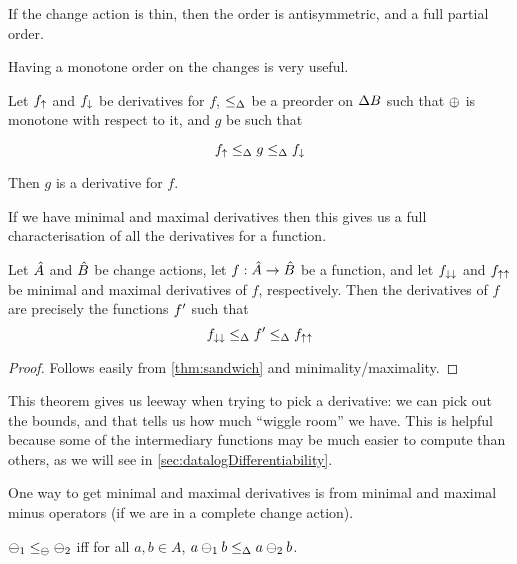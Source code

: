 If the change action is thin, then the order is antisymmetric, and a
full partial order.

Having a monotone order on the changes is very useful.

\begin{thm}
  \label{thm:sandwich}
  Let $f_\uparrow$ and $f_\downarrow$ be derivatives for $f$, $\leq_\Delta$ be a preorder on $\Delta B$ such that $\oplus$ is monotone with
  respect to it, and $g$ be such that

  \begin{displaymath}
    f_\uparrow \leq_\Delta g \leq_\Delta f_\downarrow
  \end{displaymath}

  Then $g$ is a derivative for $f$.
\end{thm}

If we have minimal and maximal derivatives then this gives us a full
characterisation of all the derivatives for a function.

\begin{thm}
\label{thm:derivativeCharacterization}
  Let $\hat{A}$ and $\hat{B}$ be change actions, let
  $f: \hat{A} \rightarrow \hat{B}$ be a function, and let $f_{\downarrow\downarrow}$ and
  $f_{\uparrow\uparrow}$ be minimal and maximal derivatives of $f$, respectively.
  Then the derivatives of $f$ are precisely
  the functions $f'$ such that
  \begin{displaymath}
    f_{\downarrow\downarrow} \leq_\Delta f' \leq_\Delta f_{\uparrow\uparrow}
  \end{displaymath}
\end{thm}
\ifproofs
\begin{proof}
  Follows easily from \cref{thm:sandwich} and minimality/maximality.
\end{proof}
\fi

This theorem gives us leeway when trying to pick a derivative: we can pick out the
bounds, and that tells us how much ``wiggle room'' we have. This is helpful
because some of the intermediary functions may be much easier to compute than
others, as we will see in \cref{sec:datalogDifferentiability}.

One way to get minimal and maximal derivatives is from minimal and maximal minus
operators (if we are in a complete change action).

\begin{defn}
  $\ominus_1 \leq_\ominus \ominus_2$ iff for all $a,b \in A$, $a \ominus_1 b
  \leq_\Delta a \ominus_2 b$.
\end{defn}

